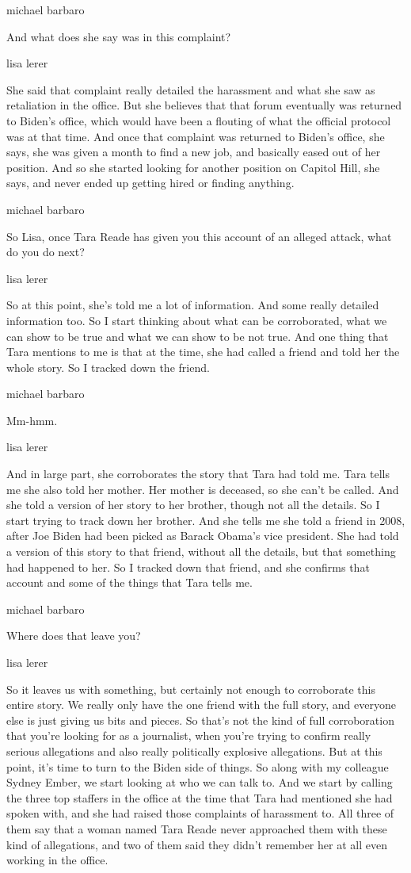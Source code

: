 michael barbaro

And what does she say was in this complaint?

lisa lerer

She said that complaint really detailed the harassment and what she saw
as retaliation in the office. But she believes that that forum
eventually was returned to Biden's office, which would have been a
flouting of what the official protocol was at that time. And once that
complaint was returned to Biden's office, she says, she was given a
month to find a new job, and basically eased out of her position. And so
she started looking for another position on Capitol Hill, she says, and
never ended up getting hired or finding anything.

michael barbaro

So Lisa, once Tara Reade has given you this account of an alleged
attack, what do you do next?

lisa lerer

So at this point, she's told me a lot of information. And some really
detailed information too. So I start thinking about what can be
corroborated, what we can show to be true and what we can show to be not
true. And one thing that Tara mentions to me is that at the time, she
had called a friend and told her the whole story. So I tracked down the
friend.

michael barbaro

Mm-hmm.

lisa lerer

And in large part, she corroborates the story that Tara had told me.
Tara tells me she also told her mother. Her mother is deceased, so she
can't be called. And she told a version of her story to her brother,
though not all the details. So I start trying to track down her brother.
And she tells me she told a friend in 2008, after Joe Biden had been
picked as Barack Obama's vice president. She had told a version of this
story to that friend, without all the details, but that something had
happened to her. So I tracked down that friend, and she confirms that
account and some of the things that Tara tells me.

michael barbaro

Where does that leave you?

lisa lerer

So it leaves us with something, but certainly not enough to corroborate
this entire story. We really only have the one friend with the full
story, and everyone else is just giving us bits and pieces. So that's
not the kind of full corroboration that you're looking for as a
journalist, when you're trying to confirm really serious allegations and
also really politically explosive allegations. But at this point, it's
time to turn to the Biden side of things. So along with my colleague
Sydney Ember, we start looking at who we can talk to. And we start by
calling the three top staffers in the office at the time that Tara had
mentioned she had spoken with, and she had raised those complaints of
harassment to. All three of them say that a woman named Tara Reade never
approached them with these kind of allegations, and two of them said
they didn't remember her at all even working in the office.

